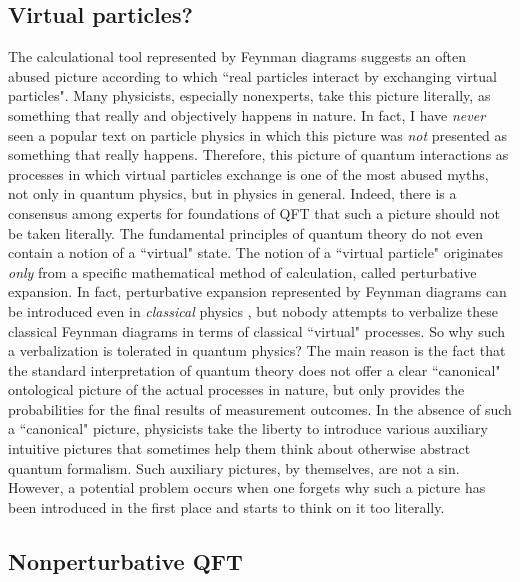 \documentclass[12pt]{article}
\begin{document}
\subsection{Virtual particles?}

The calculational tool represented by Feynman diagrams  
suggests an often abused picture according to which
``real particles interact by exchanging virtual particles".
Many physicists, especially nonexperts,
take this picture literally, as something that 
really and objectively happens in nature. In fact, I have 
{\em never} seen 
a popular text on particle physics in which this picture was 
{\em not} presented as something that really happens.
Therefore, this picture of quantum interactions as processes  
in which virtual particles exchange is one of the 
most abused myths, not only in quantum physics, but in 
physics in general. Indeed, there is a consensus among experts 
for foundations of QFT that such a picture should
not be taken literally. The fundamental principles 
of quantum theory do not even contain a notion of a
``virtual" state. The notion of a 
``virtual particle" originates {\em only} from a 
specific mathematical method of calculation, called perturbative 
expansion. In fact, perturbative expansion 
represented by Feynman diagrams can be introduced even in 
{\em classical} physics \cite{thorn,penco}, but nobody 
attempts to verbalize these classical Feynman diagrams 
in terms of classical ``virtual" processes.  
So why such a verbalization is tolerated in quantum physics?
The main reason is the fact that the standard interpretation 
of quantum theory does not offer a clear ``canonical" ontological picture 
of the actual processes in nature, but only provides 
the probabilities for the final results of measurement outcomes.
In the absence of such a ``canonical" picture, 
physicists take the liberty to introduce 
various auxiliary intuitive pictures that sometimes help them 
think about otherwise abstract quantum formalism. Such auxiliary
pictures, by themselves, are not a sin. However, a potential 
problem occurs when one forgets why such a picture has been introduced 
in the first place and starts to think on it too literally.   

\subsection{Nonperturbative QFT}
\end{document}
